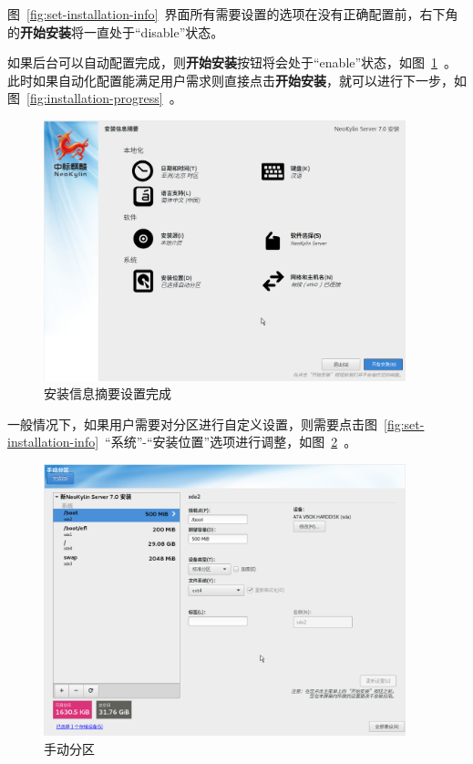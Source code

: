 \documentclass[a4paper]{ctexart}
\begin{document}
图~\ref{fig:set-installation-info}~界面所有需要设置的选项在没有正确配置前，右下角的\textbf{开始安装}将一直处于“disable”状态。

如果后台可以自动配置完成，则\textbf{开始安装}按钮将会处于“enable”状态，如图~\ref{fig:installaiton-info-complete}~。此时如果自动化配置能满足用户需求则直接点击\textbf{开始安装}，就可以进行下一步，如图~\ref{fig:installation-progress}~。

\begin{figure}[htp]
	\centering
	\includegraphics[width=10.5cm]{ns7/installation-info-complete}
	\caption{安装信息摘要设置完成}\label{fig:installaiton-info-complete}
\end{figure}


一般情况下，如果用户需要对分区进行自定义设置，则需要点击图~\ref{fig:set-installation-info}~“系统”-“安装位置”选项进行调整，如图~\ref{fig:partation-custom}~。
	
\begin{figure}[htp]
	\centering
	\includegraphics[width=10.5cm]{ns7/partation-custom}
	\caption{手动分区}\label{fig:partation-custom}
\end{figure}
 
\end{document}
